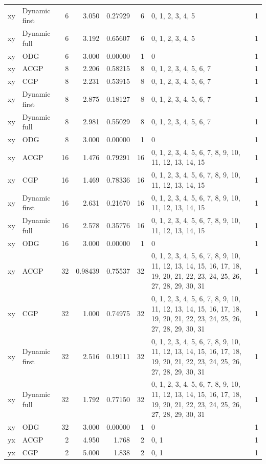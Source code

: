 \documentclass[10pt,a4paper]{article}
\begin{document}
\begin{longtable}{@{}p{23mm}p{29mm}rrrrp{36mm}r@{}}
xy & Dynamic first & 6 & 3.050 & 0.27929 & 6 & 0, 1, 2, 3, 4, 5 & 1 \\
xy & Dynamic full & 6 & 3.192 & 0.65607 & 6 & 0, 1, 2, 3, 4, 5 & 1 \\
xy & ODG & 6 & 3.000 & 0.00000 & 1 & 0 & 1 \\
xy & ACGP & 8 & 2.206 & 0.58215 & 8 & 0, 1, 2, 3, 4, 5, 6, 7 & 1 \\
xy & CGP & 8 & 2.231 & 0.53915 & 8 & 0, 1, 2, 3, 4, 5, 6, 7 & 1 \\
xy & Dynamic first & 8 & 2.875 & 0.18127 & 8 & 0, 1, 2, 3, 4, 5, 6, 7 & 1 \\
xy & Dynamic full & 8 & 2.981 & 0.55029 & 8 & 0, 1, 2, 3, 4, 5, 6, 7 & 1 \\
xy & ODG & 8 & 3.000 & 0.00000 & 1 & 0 & 1 \\
xy & ACGP & 16 & 1.476 & 0.79291 & 16 & 0, 1, 2, 3, 4, 5, 6, 7, 8, 9, 10, 11, 12, 13, 14, 15 & 1 \\
xy & CGP & 16 & 1.469 & 0.78336 & 16 & 0, 1, 2, 3, 4, 5, 6, 7, 8, 9, 10, 11, 12, 13, 14, 15 & 1 \\
xy & Dynamic first & 16 & 2.631 & 0.21670 & 16 & 0, 1, 2, 3, 4, 5, 6, 7, 8, 9, 10, 11, 12, 13, 14, 15 & 1 \\
xy & Dynamic full & 16 & 2.578 & 0.35776 & 16 & 0, 1, 2, 3, 4, 5, 6, 7, 8, 9, 10, 11, 12, 13, 14, 15 & 1 \\
xy & ODG & 16 & 3.000 & 0.00000 & 1 & 0 & 1 \\
xy & ACGP & 32 & 0.98439 & 0.75537 & 32 & 0, 1, 2, 3, 4, 5, 6, 7, 8, 9, 10, 11, 12, 13, 14, 15, 16, 17, 18, 19, 20, 21, 22, 23, 24, 25, 26, 27, 28, 29, 30, 31 & 1 \\
xy & CGP & 32 & 1.000 & 0.74975 & 32 & 0, 1, 2, 3, 4, 5, 6, 7, 8, 9, 10, 11, 12, 13, 14, 15, 16, 17, 18, 19, 20, 21, 22, 23, 24, 25, 26, 27, 28, 29, 30, 31 & 1 \\
xy & Dynamic first & 32 & 2.516 & 0.19111 & 32 & 0, 1, 2, 3, 4, 5, 6, 7, 8, 9, 10, 11, 12, 13, 14, 15, 16, 17, 18, 19, 20, 21, 22, 23, 24, 25, 26, 27, 28, 29, 30, 31 & 1 \\
xy & Dynamic full & 32 & 1.792 & 0.77150 & 32 & 0, 1, 2, 3, 4, 5, 6, 7, 8, 9, 10, 11, 12, 13, 14, 15, 16, 17, 18, 19, 20, 21, 22, 23, 24, 25, 26, 27, 28, 29, 30, 31 & 1 \\
xy & ODG & 32 & 3.000 & 0.00000 & 1 & 0 & 1 \\
yx & ACGP & 2 & 4.950 & 1.768 & 2 & 0, 1 & 1 \\
yx & CGP & 2 & 5.000 & 1.838 & 2 & 0, 1 & 1 \\

\end{longtable}
\end{document}

